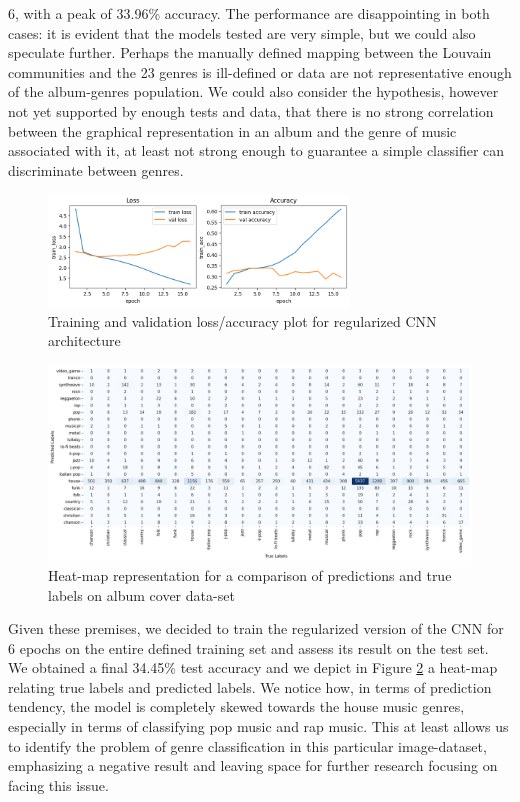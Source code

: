 \documentclass[sigchi]{acmart}
\begin{document}
6, with a peak of 33.96\% accuracy. The performance are disappointing in both cases: it is evident that the models tested are very simple, but we could also speculate further.
Perhaps the manually defined mapping between the Louvain communities and the 23 genres is ill-defined or data are not representative enough of the album-genres population. We could also consider the hypothesis, however not yet supported by enough tests and data, that there is no strong correlation between the graphical representation in an album and the genre of music associated with it, at least not strong enough to guarantee a simple classifier can discriminate between genres.

\begin{figure}[H]
\centering
\includegraphics[width=8cm]{img/train_val_loss.png}
\caption{Training and validation loss/accuracy plot for regularized CNN architecture}
\label{fig: train_val}
\end{figure}

\begin{figure}[]
\begin{center}

\centering
\includegraphics[width=13cm]{img/prediction_test_set.png}
\caption{Heat-map representation for a comparison of predictions and true labels on album cover data-set}
\label{fig: prediction_results}
\end{center}
\end{figure}

Given these premises, we decided to train the regularized version of the CNN for 6 epochs on the entire defined training set and assess its result on the test set. We obtained a final 34.45\% test accuracy and we depict in Figure \ref{fig: prediction_results} a heat-map relating true labels and predicted labels. We notice how, in terms of prediction tendency, the model is completely skewed towards the house music genres, especially in terms of classifying pop music and rap music. This at least allows us to identify the problem of genre classification in this particular image-dataset, emphasizing a negative result and leaving space for further research focusing on facing this issue.
\end{document}
